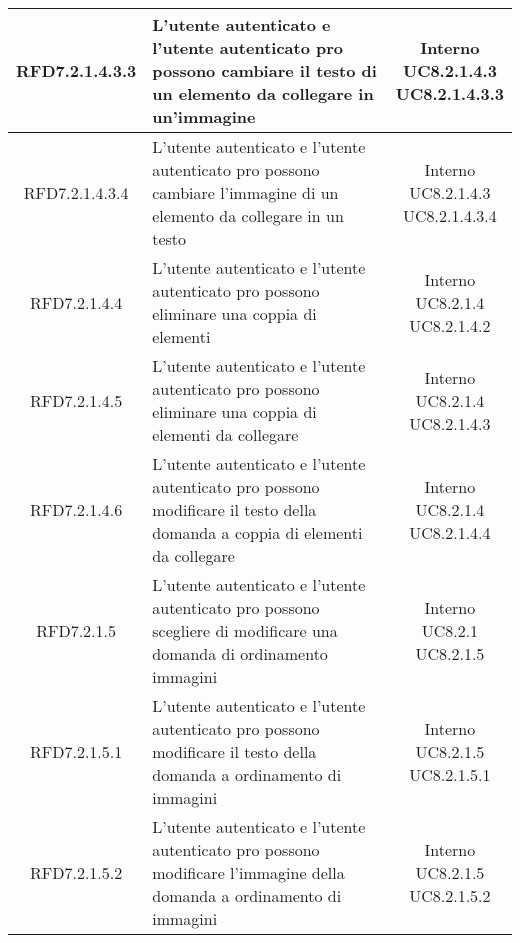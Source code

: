 \begin{longtable}{|c|>{\centering}m{7cm}|c|}
			 \hypertarget{{RFD7.2.1.4.3.3}}{{RFD7.2.1.4.3.3}} & L’utente autenticato e l'utente autenticato pro possono cambiare il testo di un elemento da collegare in un'immagine & \makecell{Interno\\ UC8.2.1.4.3 \\UC8.2.1.4.3.3 } \\ \hline
			 \hypertarget{{RFD7.2.1.4.3.4}}{{RFD7.2.1.4.3.4}} & L’utente autenticato e l'utente autenticato pro possono cambiare l’immagine di un elemento da collegare in un testo & \makecell{Interno\\ UC8.2.1.4.3 \\UC8.2.1.4.3.4 } \\ \hline
			 \hypertarget{{RFD7.2.1.4.4}}{{RFD7.2.1.4.4}} & L’utente autenticato e l'utente autenticato pro possono eliminare una coppia di elementi & \makecell{Interno\\ UC8.2.1.4 \\UC8.2.1.4.2 } \\ \hline
			 \hypertarget{{RFD7.2.1.4.5}}{{RFD7.2.1.4.5}} & L’utente autenticato e l'utente autenticato pro possono eliminare una coppia di elementi da collegare & \makecell{Interno\\ UC8.2.1.4 \\UC8.2.1.4.3 } \\ \hline
			 \hypertarget{{RFD7.2.1.4.6}}{{RFD7.2.1.4.6}} & L’utente autenticato e l'utente autenticato pro possono modificare il testo della domanda a coppia di elementi da collegare  & \makecell{Interno\\ UC8.2.1.4 \\UC8.2.1.4.4 } \\ \hline
			 \hypertarget{{RFD7.2.1.5}}{{RFD7.2.1.5}} & L’utente autenticato e l’utente autenticato pro possono scegliere di modificare una domanda di ordinamento immagini & \makecell{Interno\\ UC8.2.1 \\UC8.2.1.5 } \\ \hline
			 \hypertarget{{RFD7.2.1.5.1}}{{RFD7.2.1.5.1}} & L’utente autenticato e l'utente autenticato pro possono modificare il testo della domanda a ordinamento di immagini & \makecell{Interno\\ UC8.2.1.5 \\UC8.2.1.5.1 } \\ \hline
			 \hypertarget{{RFD7.2.1.5.2}}{{RFD7.2.1.5.2}} & L’utente autenticato e l'utente autenticato pro possono modificare l’immagine della domanda a ordinamento di immagini  & \makecell{Interno\\ UC8.2.1.5 \\UC8.2.1.5.2 } \\ \hline

\end{longtable}
